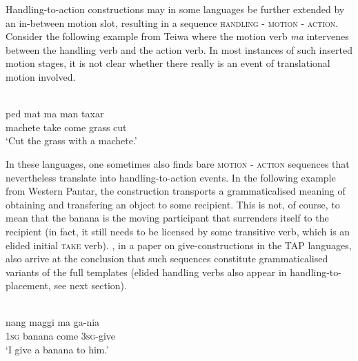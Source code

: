 Handling-to-action constructions may in some languages be further extended by an in-between motion slot, resulting in a sequence \textsc{handling - motion - action}. Consider the following example from Teiwa where the motion verb \textit{ma} intervenes between the handling verb and the action verb. In most instances of such inserted motion stages, it is not clear whether there really is an event of translational motion involved.

\ea 
{}\\
\gll ped mat ma man taxar \\
machete take come grass cut \\
\glft `Cut the grass with a machete.'\\ 
\z

In these languages, one sometimes also finds bare \textsc{motion - action} sequences that nevertheless translate into handling-to-action events. In the following example from Western Pantar, the construction transports a grammaticalised meaning of obtaining and transfering an object to some recipient. This is not, of course, to mean that the banana is the moving participant that surrenders itself to the recipient (in fact, it still needs to be licensed by some transitive verb, which is an elided initial \textsc{take} verb). \citet{klamer2012development}, in a paper on give-constructions in the TAP languages, also arrive at the conclusion that such sequences constitute grammaticalised variants of the full templates (elided handling verbs also appear in handling-to-placement, see next section).

\ea 
{}\\
\gll nang maggi ma ga-nia \\
\textsc{1}\textsc{sg} banana come \textsc{3}\textsc{sg}-give \\
\glft ‘I give a banana to him.’\\ 
\z

